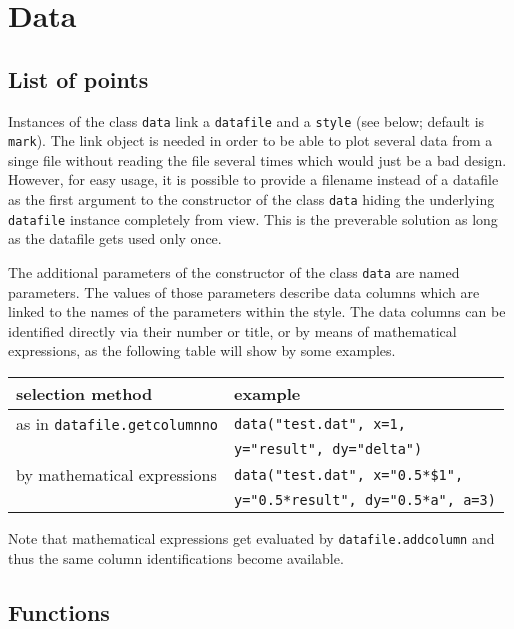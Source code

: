 \section{Data}
\label{graph:data}

\subsection{List of points}

Instances of the class \verb|data| link a \verb|datafile| and a
\verb|style| (see below; default is \verb|mark|). The link object is
needed in order to be able to plot several data from a singe file
without reading the file several times which would just be a bad
design. However, for easy usage, it is possible to provide a filename
instead of a datafile as the first argument to the constructor of the
class \verb|data| hiding the underlying \verb|datafile| instance
completely from view. This is the preverable solution as long as the
datafile gets used only once.

The additional parameters of the constructor of the class \verb|data|
are named parameters. The values of those parameters describe data
columns which are linked to the names of the parameters within the
style. The data columns can be identified directly via their number or
title, or by means of mathematical expressions, as the following table
will show by some examples.

\begin{center}
\begin{tabular}{ll}
selection method&example\\
\hline
as in \texttt{datafile.getcolumnno}&\texttt{data("test.dat", x=1,}\\
&\texttt{\hphantom{data(}y="result", dy="delta")}\\
by mathematical expressions&\texttt{data("test.dat", x="0.5*\$1",}\\
&\texttt{\hphantom{data(}y="0.5*result", dy="0.5*a", a=3)}\\
\end{tabular}
\end{center}

Note that mathematical expressions get evaluated by
\verb|datafile.addcolumn| and thus the same column identifications
become available.

\subsection{Functions}

